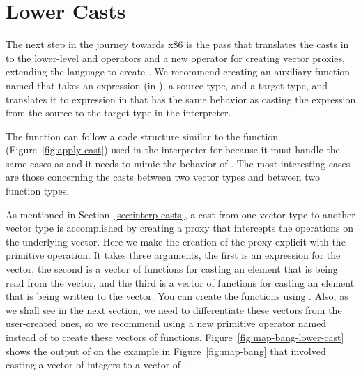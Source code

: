 \documentclass[7x10]{TimesAPriori_MIT}%
\begin{document}
\section{Lower Casts}
\label{sec:lower-casts}

The next step in the journey towards x86 is the 
pass that translates the casts in \LangCast{} to the lower-level
 and  operators and a new operator for
creating vector proxies, extending the \LangLoop{} language to create
\LangProxy{}. We recommend creating an auxiliary function named
 that takes an expression (in \LangCast{}), a source type,
and a target type, and translates it to expression in \LangProxy{} that has
the same behavior as casting the expression from the source to the
target type in the interpreter.

The  function can follow a code structure similar to
the  function (Figure~\ref{fig:apply-cast}) used in
the interpreter for \LangCast{} because it must handle the same cases as
 and it needs to mimic the behavior of
. The most interesting cases are those concerning the
casts between two vector types and between two function types.

As mentioned in Section~\ref{sec:interp-casts}, a cast from one vector
type to another vector type is accomplished by creating a proxy that
intercepts the operations on the underlying vector. Here we make the
creation of the proxy explicit with the  primitive
operation. It takes three arguments, the first is an expression for
the vector, the second is a vector of functions for casting an element
that is being read from the vector, and the third is a vector of
functions for casting an element that is being written to the vector.
You can create the functions using . Also, as we shall
see in the next section, we need to differentiate these vectors from
the user-created ones, so we recommend using a new primitive operator
named  instead of  to create these
vectors of functions. Figure~\ref{fig:map-bang-lower-cast} shows
the output of  on the example in
Figure~\ref{fig:map-bang} that involved casting a vector of
integers to a vector of .
\end{document}
